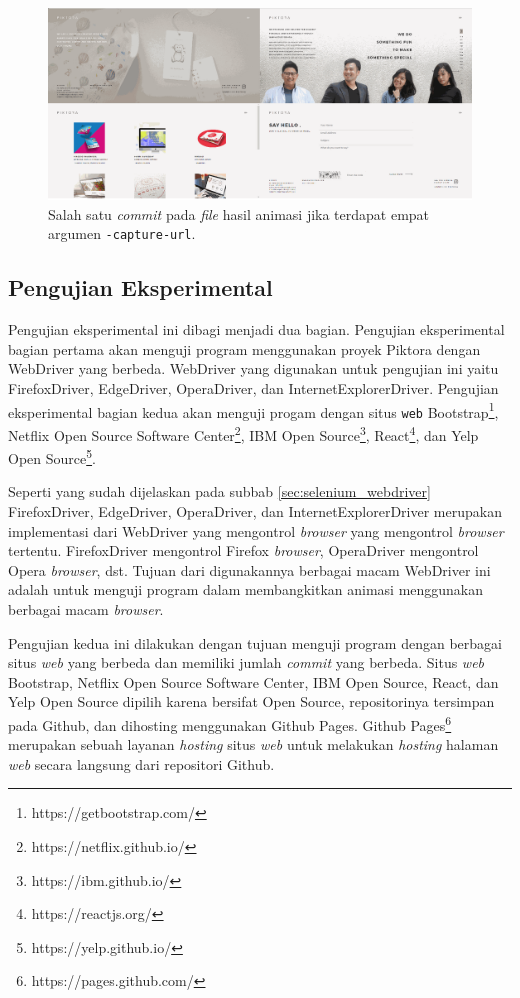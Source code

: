 \begin{figure}[H]
	\centering
		\includegraphics[scale=0.3]{Gambar/capture4.png}
	\caption{Salah satu \textit{commit} pada \textit{file} hasil animasi jika terdapat empat argumen \texttt{-capture-url}.}
	\label{fig:capture4}
\end{figure}




\subsection{Pengujian Eksperimental}
\label{sec:pengujian_eksperimental} 
Pengujian eksperimental ini dibagi menjadi dua bagian. Pengujian eksperimental bagian pertama akan menguji program menggunakan proyek Piktora dengan WebDriver yang berbeda. WebDriver yang digunakan untuk pengujian ini yaitu FirefoxDriver, EdgeDriver, OperaDriver, dan InternetExplorerDriver. Pengujian eksperimental bagian kedua akan menguji progam dengan situs \texttt{web} Bootstrap\footnote{https://getbootstrap.com/}, Netflix Open Source Software Center\footnote{https://netflix.github.io/}, IBM Open Source\footnote{https://ibm.github.io/}, React\footnote{https://reactjs.org/}, dan Yelp Open Source\footnote{https://yelp.github.io/}. 

Seperti yang sudah dijelaskan pada subbab \ref{sec:selenium_webdriver} FirefoxDriver, EdgeDriver, OperaDriver, dan InternetExplorerDriver merupakan implementasi dari WebDriver yang mengontrol \textit{browser} yang mengontrol \textit{browser} tertentu. FirefoxDriver mengontrol Firefox \textit{browser}, OperaDriver mengontrol Opera \textit{browser}, dst. Tujuan dari digunakannya berbagai macam WebDriver ini adalah untuk menguji program dalam membangkitkan animasi menggunakan berbagai macam \textit{browser}.

Pengujian kedua ini dilakukan dengan tujuan menguji program dengan berbagai situs \textit{web} yang berbeda dan memiliki jumlah \textit{commit} yang berbeda. Situs \textit{web} Bootstrap, Netflix Open Source Software Center, IBM Open Source, React, dan Yelp Open Source  dipilih karena bersifat Open Source, repositorinya tersimpan pada Github, dan dihosting menggunakan Github Pages. Github Pages\footnote{https://pages.github.com/} merupakan sebuah layanan \textit{hosting} situs \textit{web} untuk melakukan \textit{hosting} halaman \textit{web} secara langsung dari repositori Github.     

